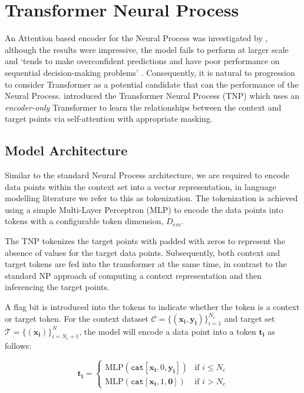 \documentclass[../../main.tex]{subfiles}
\begin{document}
\section{Transformer Neural Process}

An Attention based encoder for the Neural Process was investigated by \cite{kim2019attentive}, although the results were impressive, the model fails to perform at larger scale and `tends to make overconfident predictions and have poor performance on sequential decision-making problems' \parencite{nguyen2023transformer}. Consequently, it is natural to progression to consider Transformer \parencite{vaswani2017attention} as a potential candidate that can the performance of the Neural Process. \cite{nguyen2023transformer} introduced the Transformer Neural Process (TNP) which uses an \emph{encoder-only} Transformer to learn the relationships between the context and target points via self-attention with appropriate masking.

\subsection{Model Architecture}

Similar to the standard Neural Process architecture, we are required to encode data points within the context set into a vector representation, in language modelling literature we refer to this as tokenization. The tokenization is achieved using a simple Multi-Layer Perceptron (MLP) to encode the data points into tokens with a configurable token dimension, $D_{em}$.

The TNP tokenizes the target points with padded with zeros to represent the absence of values for the target data points. Subsequently, both context and target tokens are fed into the transformer at the same time, in contrast to the standard NP approach of computing a  context representation and then inferencing the target points.

A flag bit is introduced into the tokens to indicate whether the token is a context or target token. For the context dataset $\mathcal{C} = \{(\bm{x_i}, \bm{y_i})\}_{i=1}^{N_c}$ and target set $\mathcal{T} = \{(\bm{x_i})\}_{i=N_c+1}^{N}$, the model will encode a data point into a token $\bm{t_i}$ as follows:

\[
	\bm{t_i} = \begin{cases}
		\text{MLP}(\texttt{cat}[\bm{x_i},  0, \bm{y_i}]) & \text{if } i \leq N_c \\
		\text{MLP}(\texttt{cat}[\bm{x_i},  1, \bm{ 0}]) & \text{if } i > N_c
	\end{cases}
\]
\end{document}
